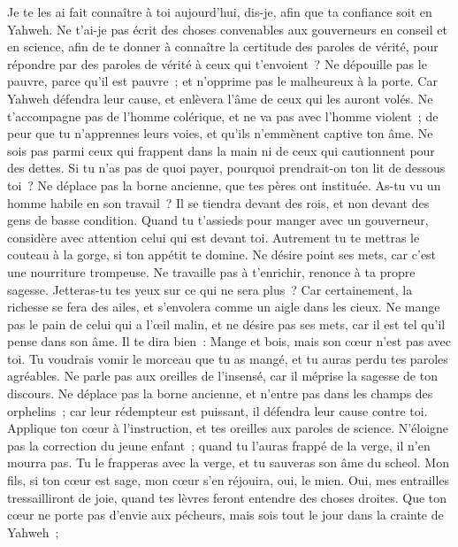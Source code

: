 \begin{multicols}{2}
Je te les ai fait connaître à toi aujourd'hui, dis-je, afin que ta confiance soit en Yahweh.
Ne t'ai-je pas écrit des choses convenables aux gouverneurs en conseil et en science,
afin de te donner à connaître la certitude des paroles de vérité, pour répondre par des paroles de vérité à ceux qui t'envoient~?
Ne dépouille pas le pauvre, parce qu'il est pauvre~; et n'opprime pas le malheureux à la porte.
Car Yahweh défendra leur cause, et enlèvera l'âme de ceux qui les auront volés.
Ne t'accompagne pas de l'homme colérique, et ne va pas avec l'homme violent~;
de peur que tu n'apprennes leurs voies, et qu'ils n'emmènent captive ton âme.
Ne sois pas parmi ceux qui frappent dans la main ni de ceux qui cautionnent pour des dettes.
Si tu n'as pas de quoi payer, pourquoi prendrait-on ton lit de dessous toi~?
Ne déplace pas la borne ancienne, que tes pères ont instituée.
As-tu vu un homme habile en son travail~? Il se tiendra devant des rois, et non devant des gens de basse condition.
\VerseOne{}Quand tu t'assieds pour manger avec un gouverneur, considère avec attention celui qui est devant toi.
Autrement tu te mettras le couteau à la gorge, si ton appétit te domine.
Ne désire point ses mets, car c'est une nourriture trompeuse.
Ne travaille pas à t'enrichir, renonce à ta propre sagesse.
Jetteras-tu tes yeux sur ce qui ne sera plus~? Car certainement, la richesse se fera des ailes, et s'envolera comme un aigle dans les cieux.
Ne mange pas le pain de celui qui a l'œil malin, et ne désire pas ses mets,
car il est tel qu'il pense dans son âme. Il te dira bien~: Mange et bois, mais son cœur n'est pas avec toi.
Tu voudrais vomir le morceau que tu as mangé, et tu auras perdu tes paroles agréables.
Ne parle pas aux oreilles de l'insensé, car il méprise la sagesse de ton discours.
Ne déplace pas la borne ancienne, et n'entre pas dans les champs des orphelins~;
car leur rédempteur est puissant, il défendra leur cause contre toi.
Applique ton cœur à l'instruction, et tes oreilles aux paroles de science.
N'éloigne pas la correction du jeune enfant~; quand tu l'auras frappé de la verge, il n'en mourra pas.
Tu le frapperas avec la verge, et tu sauveras son âme du scheol.
Mon fils, si ton cœur est sage, mon cœur s'en réjouira, oui, le mien.
Oui, mes entrailles tressailliront de joie, quand tes lèvres feront entendre des choses droites.
Que ton cœur ne porte pas d'envie aux pécheurs, mais sois tout le jour dans la crainte de Yahweh~;

\end{multicols}
